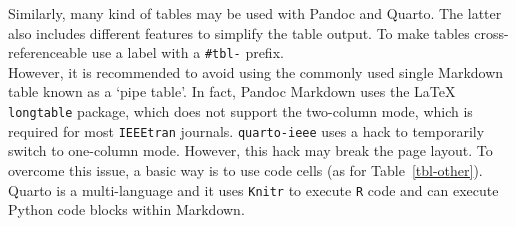 \documentclass[
  journal,
]{IEEEtran}%
\begin{document}
Similarly, many kind of tables may be used with Pandoc and Quarto. The
latter also includes different features to simplify the table output. To
make tables cross-referenceable use a label with a \texttt{\#tbl-}
prefix.\\
However, it is recommended to avoid using the commonly used single
Markdown table known as a `pipe table'. In fact, Pandoc Markdown uses
the {\LaTeX} \texttt{longtable} package, which does not support the
two-column mode, which is required for most \texttt{IEEEtran} journals.
\texttt{quarto-ieee} uses a hack to temporarily switch to one-column
mode. However, this hack may break the page layout. To overcome this
issue, a basic way is to use code cells (as for Table~\ref{tbl-other}).
Quarto is a multi-language and it uses \texttt{Knitr} to execute
\texttt{R} code and can execute Python code blocks within Markdown.

\begin{table}

\caption{\label{tbl-panel}Main Caption}

\begin{minipage}[t]{0.50\linewidth}



\end{minipage}%
%
\begin{minipage}[t]{0.50\linewidth}



\end{minipage}%

\end{table}%
\end{document}
